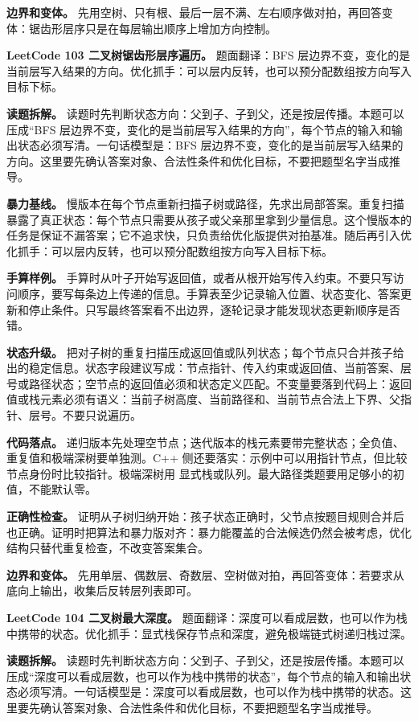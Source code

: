\textbf{边界和变体。} 先用空树、只有根、最后一层不满、左右顺序做对拍，再回答变体：锯齿形层序只是在每层输出顺序上增加方向控制。

\noindent\textbf{LeetCode 103 二叉树锯齿形层序遍历。} 题面翻译：BFS 层边界不变，变化的是当前层写入结果的方向。优化抓手：可以层内反转，也可以预分配数组按方向写入目标下标。

\textbf{读题拆解。} 读题时先判断状态方向：父到子、子到父，还是按层传播。本题可以压成“BFS 层边界不变，变化的是当前层写入结果的方向”，每个节点的输入和输出状态必须写清。一句话模型是：BFS 层边界不变，变化的是当前层写入结果的方向。这里要先确认答案对象、合法性条件和优化目标，不要把题型名字当成推导。

\textbf{暴力基线。} 慢版本在每个节点重新扫描子树或路径，先求出局部答案。重复扫描暴露了真正状态：每个节点只需要从孩子或父亲那里拿到少量信息。这个慢版本的任务是保证不漏答案；它不追求快，只负责给优化版提供对拍基准。随后再引入优化抓手：可以层内反转，也可以预分配数组按方向写入目标下标。

\textbf{手算样例。} 手算时从叶子开始写返回值，或者从根开始写传入约束。不要只写访问顺序，要写每条边上传递的信息。手算表至少记录输入位置、状态变化、答案更新和停止条件。只写最终答案看不出边界，逐轮记录才能发现状态更新顺序是否错。

\textbf{状态升级。} 把对子树的重复扫描压成返回值或队列状态；每个节点只合并孩子给出的稳定信息。状态字段建议写成：节点指针、传入约束或返回值、当前答案、层号或路径状态；空节点的返回值必须和状态定义匹配。不变量要落到代码上：返回值或栈元素必须有语义：当前子树高度、当前路径和、当前节点合法上下界、父指针、层号。不要只说遍历。

\textbf{代码落点。} 递归版本先处理空节点；迭代版本的栈元素要带完整状态；全负值、重复值和极端深树要单独测。C++ 侧还要落实：示例中可以用指针节点，但比较节点身份时比较指针。极端深树用  显式栈或队列。最大路径类题要用足够小的初值，不能默认零。

\textbf{正确性检查。} 证明从子树归纳开始：孩子状态正确时，父节点按题目规则合并后也正确。证明时把算法和暴力版对齐：暴力能覆盖的合法候选仍然会被考虑，优化结构只替代重复检查，不改变答案集合。

\textbf{边界和变体。} 先用单层、偶数层、奇数层、空树做对拍，再回答变体：若要求从底向上输出，收集后反转层列表即可。

\noindent\textbf{LeetCode 104 二叉树最大深度。} 题面翻译：深度可以看成层数，也可以作为栈中携带的状态。优化抓手：显式栈保存节点和深度，避免极端链式树递归栈过深。

\textbf{读题拆解。} 读题时先判断状态方向：父到子、子到父，还是按层传播。本题可以压成“深度可以看成层数，也可以作为栈中携带的状态”，每个节点的输入和输出状态必须写清。一句话模型是：深度可以看成层数，也可以作为栈中携带的状态。这里要先确认答案对象、合法性条件和优化目标，不要把题型名字当成推导。

